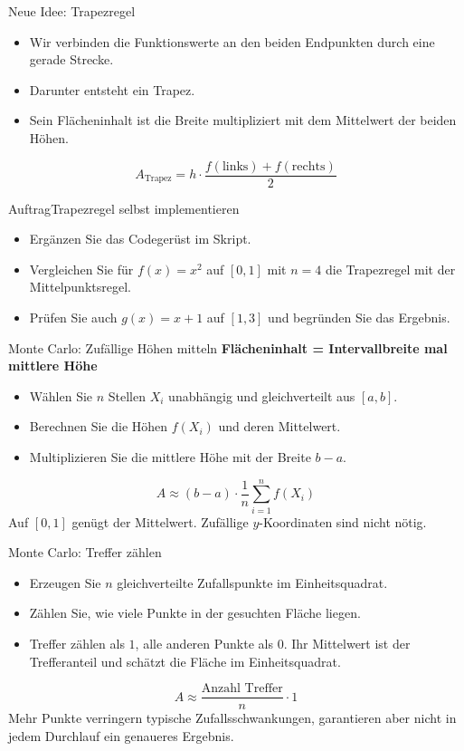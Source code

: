 \begin{frame}{Neue Idee: Trapezregel}
    \begin{itemize}
        \item Wir verbinden die Funktionswerte an den beiden Endpunkten durch eine gerade Strecke.
        \item Darunter entsteht ein Trapez.
        \item Sein Flächeninhalt ist die Breite multipliziert mit dem Mittelwert der beiden Höhen.
    \end{itemize}
    \[
        A_{\text{Trapez}} = h\cdot\frac{f(\text{links})+f(\text{rechts})}{2}
    \]
\end{frame}

\begin{frame}{Auftrag}{Trapezregel selbst implementieren}
    \begin{itemize}
        \item Ergänzen Sie das Codegerüst im Skript.
        \item Vergleichen Sie für $f(x)=x^2$ auf $[0,1]$ mit $n=4$ die Trapezregel mit der Mittelpunktsregel.
        \item Prüfen Sie auch $g(x)=x+1$ auf $[1,3]$ und begründen Sie das Ergebnis.
    \end{itemize}
\end{frame}

\begin{frame}{Monte Carlo: Zufällige Höhen mitteln}
    \textbf{Flächeninhalt = Intervallbreite mal mittlere Höhe}
    \begin{itemize}
        \item Wählen Sie $n$ Stellen $X_i$ unabhängig und gleichverteilt aus $[a,b]$.
        \item Berechnen Sie die Höhen $f(X_i)$ und deren Mittelwert.
        \item Multiplizieren Sie die mittlere Höhe mit der Breite $b-a$.
    \end{itemize}
    \[
        A\approx (b-a)\cdot\frac{1}{n}\sum_{i=1}^{n}f(X_i)
    \]
    Auf $[0,1]$ genügt der Mittelwert. Zufällige $y$-Koordinaten sind nicht nötig.
\end{frame}

\begin{frame}{Monte Carlo: Treffer zählen}
    \begin{itemize}
        \item Erzeugen Sie $n$ gleichverteilte Zufallspunkte im Einheitsquadrat.
        \item Zählen Sie, wie viele Punkte in der gesuchten Fläche liegen.
        \item Treffer zählen als $1$, alle anderen Punkte als $0$. Ihr Mittelwert ist der Trefferanteil und schätzt die Fläche im Einheitsquadrat.
    \end{itemize}
    \[
        A\approx\frac{\text{Anzahl Treffer}}{n}\cdot 1
    \]
    Mehr Punkte verringern typische Zufallsschwankungen, garantieren aber nicht in jedem Durchlauf ein genaueres Ergebnis.
\end{frame}

